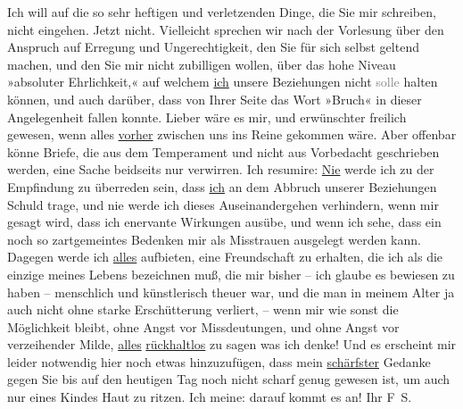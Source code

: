 \pstart
           Ich will auf die so sehr heftigen und verletzenden Dinge, die Sie mir schreiben,
               nicht eingehen. Jetzt nicht. Vielleicht sprechen wir nach der Vorlesung über den
               Anspruch auf Erregung und Ungerechtigkeit, den Sie für sich selbst geltend machen,
               und den Sie mir nicht zubilligen wollen, über das hohe Niveau »absoluter
               Ehrlichkeit,« auf welchem \uline{ich} unsere Beziehungen
               nicht \textcolor{gray}{solle} halten können, und auch darüber, dass von Ihrer Seite
               das Wort »Bruch« in dieser Angelegenheit fallen konnte. Lieber wäre es mir, und
               erwünschter freilich gewesen, wenn alles \uline{vorher}
               zwischen uns ins Reine gekommen wäre. Aber offenbar könne
               Briefe, die aus dem Temperament und nicht aus Vorbedacht geschrieben werden, eine
               Sache beidseits nur verwirren. Ich resumire: \uline{Nie} werde ich {\pb}zu der Empfindung zu überreden
               sein, dass \uline{ich} an dem Abbruch unserer Beziehungen
               Schuld trage, und nie werde ich dieses Auseinandergehen verhindern, wenn mir gesagt
               wird, dass ich enervante Wirkungen ausübe, und wenn ich sehe, dass ein noch so
               zartgemeintes Bedenken mir als Misstrauen ausgelegt werden kann. Dagegen werde ich
                  \uline{alles} aufbieten, eine Freundschaft zu erhalten,
               die ich als die einzige meines Lebens bezeichnen muß, die mir bisher – ich glaube es
               bewiesen zu haben – menschlich und künstlerisch theuer war, und die man in meinem
               Alter ja auch nicht ohne starke Erschütterung verliert, – wenn mir wie sonst die
               Möglichkeit bleibt, ohne Angst vor Missdeutungen, und ohne Angst vor verzeihender
               Milde, \uline{alles}{ }\uline{rückhaltlos} zu sagen was ich denke! Und es erscheint
               mir leider notwendig hier noch etwas hinzuzufügen, dass mein \uline{schärfster} Gedanke \introOben{}gegen Sie\introOben{} bis auf den
               heutigen Tag noch nicht scharf genug gewesen ist, um auch nur eines Kindes Haut zu
               ritzen. Ich meine: darauf kommt es an!\pend
           \pstart Ihr \spacefill\mbox{F S.}\pend{}\endnumbering{}  
      